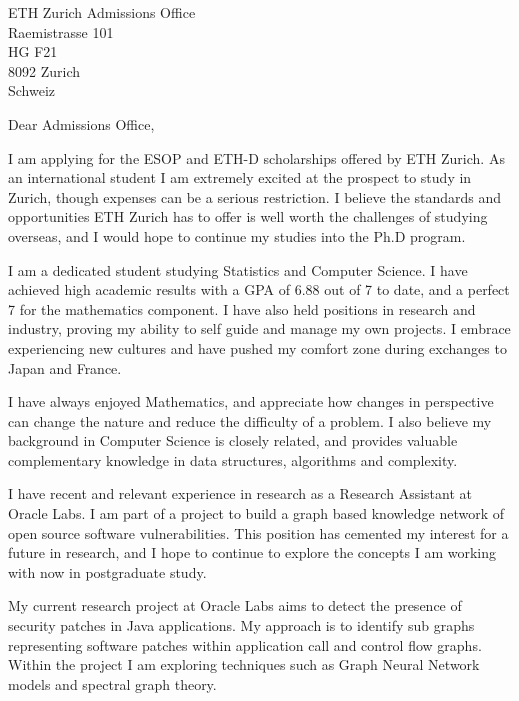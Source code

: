 \noindent
ETH Zurich Admissions Office\\
Raemistrasse 101\\
HG F21\\
8092 Zurich\\
Schweiz\\
\vspace*{20pt}

\noindent
Dear Admissions Office,
\vspace*{10pt}

I am applying for the ESOP and ETH-D scholarships offered by ETH Zurich. As an international student I am extremely excited at the prospect to study in Zurich, though expenses can be a serious restriction. I believe the standards and opportunities ETH Zurich has to offer is well worth the challenges of studying overseas, and I would hope to continue my studies into the Ph.D program.
\vspace*{10pt}

I am a dedicated student studying Statistics and Computer Science. I have achieved high academic results with a GPA of 6.88 out of 7 to date, and a perfect 7 for the mathematics component. I have also held positions in research and industry, proving my ability to self guide and manage my own projects. I embrace experiencing new cultures and have pushed my comfort zone during exchanges to Japan and France.
\vspace*{10pt}

I have always enjoyed Mathematics, and appreciate how changes in perspective can change the nature and reduce the difficulty of a problem. I also believe my background in Computer Science is closely related, and provides valuable complementary knowledge in data structures, algorithms and complexity.
\vspace*{10pt}

I have recent and relevant experience in research as a Research Assistant at Oracle Labs. I am part of a project to build a graph based knowledge network of open source software vulnerabilities. This position has cemented my interest for a future in research, and I hope to continue to explore the concepts I am working with now in postgraduate study.
\vspace*{10pt}

My current research project at Oracle Labs aims to detect the presence of security patches in Java applications. My approach is to identify sub graphs representing software patches within application call and control flow graphs. Within the project I am exploring techniques such as Graph Neural Network models and spectral graph theory. 
\vspace*{10pt}

